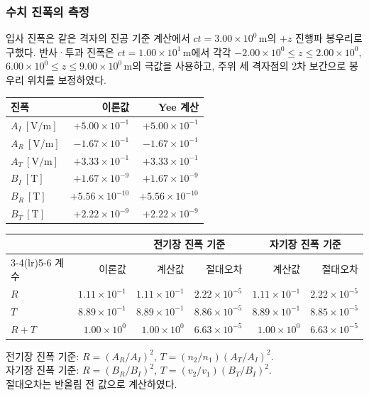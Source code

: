 \documentclass[11pt,a4paper]{article}
\newcommand{\unit}[1]{\,\mathrm{#1}}
\newcommand{\sci}[2]{\mathord{#1\times10^{#2}}}
\begin{document}
\subsubsection{수치 진폭의 측정}
입사 진폭은 같은 격자의 진공 기준 계산에서 $ct=\sci{3.00}{0}\unit m$의 $+z$ 진행파 봉우리로 구했다.
반사·투과 진폭은 $ct=\sci{1.00}{1}\unit m$에서 각각
$\sci{-2.00}{0}\le z\le\sci{2.00}{0}$, $\sci{6.00}{0}\le z\le\sci{9.00}{0}\unit m$의 극값을 사용하고,
주위 세 격자점의 2차 보간으로 봉우리 위치를 보정하였다.
\begin{center}\small\renewcommand{\arraystretch}{1.3}
\begin{tabular}{lrr}\toprule
진폭 & 이론값 & Yee 계산\\\midrule
$A_I\ [\mathrm{V/m}]$ & $\sci{+5.00}{-1}$ & $\sci{+5.00}{-1}$\\
$A_R\ [\mathrm{V/m}]$ & $\sci{-1.67}{-1}$ & $\sci{-1.67}{-1}$\\
$A_T\ [\mathrm{V/m}]$ & $\sci{+3.33}{-1}$ & $\sci{+3.33}{-1}$\\
$B_I\ [\mathrm T]$ & $\sci{+1.67}{-9}$ & $\sci{+1.67}{-9}$\\
$B_R\ [\mathrm T]$ & $\sci{+5.56}{-10}$ & $\sci{+5.56}{-10}$\\
$B_T\ [\mathrm T]$ & $\sci{+2.22}{-9}$ & $\sci{+2.22}{-9}$\\\bottomrule
\end{tabular}\par\vspace{0.6em}
\renewcommand{\arraystretch}{1.2}
\setlength{\tabcolsep}{5pt}
\begin{tabular}{lrrrrr}\toprule
 & & \multicolumn{2}{c}{전기장 진폭 기준} & \multicolumn{2}{c}{자기장 진폭 기준}\\
\cmidrule(lr){3-4}\cmidrule(lr){5-6}
계수 & 이론값 & 계산값 & 절대오차 & 계산값 & 절대오차\\\midrule
$R$ & $\sci{1.11}{-1}$ & $\sci{1.11}{-1}$ & $\sci{2.22}{-5}$ & $\sci{1.11}{-1}$ & $\sci{2.22}{-5}$\\
$T$ & $\sci{8.89}{-1}$ & $\sci{8.89}{-1}$ & $\sci{8.86}{-5}$ & $\sci{8.89}{-1}$ & $\sci{8.85}{-5}$\\
$R+T$ & $\sci{1.00}{0}$ & $\sci{1.00}{0}$ & $\sci{6.63}{-5}$ & $\sci{1.00}{0}$ & $\sci{6.63}{-5}$\\\bottomrule
\end{tabular}\par\vspace{0.5em}
\parbox{\linewidth}{전기장 진폭 기준: $R=(A_R/A_I)^2$, $T=(n_2/n_1)(A_T/A_I)^2$.\\
자기장 진폭 기준: $R=(B_R/B_I)^2$, $T=(v_2/v_1)(B_T/B_I)^2$.\\
절대오차는 반올림 전 값으로 계산하였다.}
\end{center}
\end{document}
